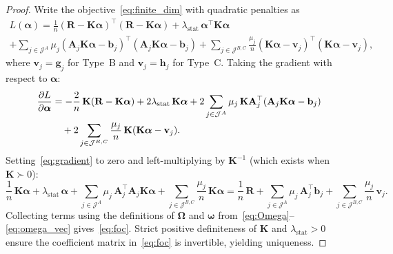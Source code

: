 \begin{proof}
Write the objective~\eqref{eq:finite_dim} with quadratic penalties as
\begin{multline}
\label{eq:obj_expanded}
L(\boldsymbol{\alpha})
= \frac{1}{n}(\mathbf{R} - \mathbf{K}\boldsymbol{\alpha})^\top
  (\mathbf{R} - \mathbf{K}\boldsymbol{\alpha})
+ \lambda_{\mathrm{stat}}\,\boldsymbol{\alpha}^\top\mathbf{K}\boldsymbol{\alpha} \\
+ \sum_{j \in \mathcal{J}^A} \mu_j
  (\mathbf{A}_j\mathbf{K}\boldsymbol{\alpha} - \mathbf{b}_j)^\top
  (\mathbf{A}_j\mathbf{K}\boldsymbol{\alpha} - \mathbf{b}_j)
+ \sum_{j \in \mathcal{J}^{B,C}} \frac{\mu_j}{n}
  (\mathbf{K}\boldsymbol{\alpha} - \mathbf{v}_j)^\top
  (\mathbf{K}\boldsymbol{\alpha} - \mathbf{v}_j),
\end{multline}
where $\mathbf{v}_j = \mathbf{g}_j$ for Type~B and $\mathbf{v}_j = \mathbf{h}_j$ for Type~C.
Taking the gradient with respect to $\boldsymbol{\alpha}$:
\begin{align}
\frac{\partial L}{\partial \boldsymbol{\alpha}}
&= -\frac{2}{n}\,\mathbf{K}(\mathbf{R} - \mathbf{K}\boldsymbol{\alpha})
+ 2\lambda_{\mathrm{stat}}\,\mathbf{K}\boldsymbol{\alpha}
+ 2\sum_{j \in \mathcal{J}^A} \mu_j\,\mathbf{K}\mathbf{A}_j^\top
  (\mathbf{A}_j\mathbf{K}\boldsymbol{\alpha} - \mathbf{b}_j)
\notag \\
&\quad + 2\sum_{j \in \mathcal{J}^{B,C}} \frac{\mu_j}{n}\,\mathbf{K}
  (\mathbf{K}\boldsymbol{\alpha} - \mathbf{v}_j).
\label{eq:gradient}
\end{align}
Setting~\eqref{eq:gradient} to zero and left-multiplying by $\mathbf{K}^{-1}$
(which exists when $\mathbf{K} \succ 0$):
\[
\frac{1}{n}\,\mathbf{K}\boldsymbol{\alpha}
+ \lambda_{\mathrm{stat}}\,\boldsymbol{\alpha}
+ \sum_{j \in \mathcal{J}^A} \mu_j\,\mathbf{A}_j^\top\mathbf{A}_j
  \mathbf{K}\boldsymbol{\alpha}
+ \sum_{j \in \mathcal{J}^{B,C}} \frac{\mu_j}{n}\,\mathbf{K}\boldsymbol{\alpha}
= \frac{1}{n}\,\mathbf{R}
+ \sum_{j \in \mathcal{J}^A} \mu_j\,\mathbf{A}_j^\top\mathbf{b}_j
+ \sum_{j \in \mathcal{J}^{B,C}} \frac{\mu_j}{n}\,\mathbf{v}_j.
\]
Collecting terms using the definitions of $\boldsymbol{\Omega}$
and $\boldsymbol{\omega}$ from~\eqref{eq:Omega}--\eqref{eq:omega_vec}
gives~\eqref{eq:foc}.
Strict positive definiteness of $\mathbf{K}$ and $\lambda_{\mathrm{stat}} > 0$
ensure the coefficient matrix in~\eqref{eq:foc} is invertible, yielding
uniqueness.
\end{proof}

